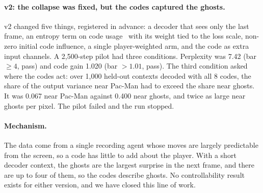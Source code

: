 \documentclass[11pt]{article}
\begin{document}
\paragraph{v2: the collapse was fixed, but the codes captured the ghosts.} v2 changed five things, registered in
advance: a decoder that sees only the last frame, an entropy term on code usage~\cite{yu2024magvit2} with its weight
tied to the loss scale, non-zero initial code influence, a single player-weighted arm, and the code as extra input
channels. A 2,500-step pilot had three conditions. Perplexity was 7.42 (bar $\ge 4$, pass) and code gain 1.020 (bar
$>1.01$, pass). The third condition asked where the codes act: over 1,000 held-out contexts decoded with all 8
codes, the share of the output variance near Pac-Man had to exceed the share near ghosts. It was 0.067 near Pac-Man
against 0.400 near ghosts, and twice as large near ghosts per pixel. The pilot failed and the run stopped.

\paragraph{Mechanism.} The data come from a single recording agent whose moves are largely predictable from the
screen, so a code has little to add about the player. With a short decoder context, the ghosts are the largest
surprise in the next frame, and there are up to four of them, so the codes describe ghosts. No controllability
result exists for either version, and we have closed this line of work.
\end{document}
